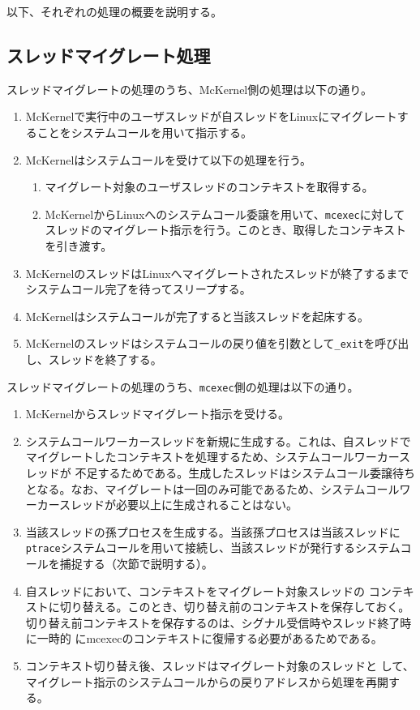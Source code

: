 \documentclass[twoside,11pt,fleqn]{book}
\begin{document}
以下、それぞれの処理の概要を説明する。

\subsection{スレッドマイグレート処理}
スレッドマイグレートの処理のうち、McKernel側の処理は以下の通り。
\begin{enumerate}
\item McKernelで実行中のユーザスレッドが自スレッドをLinuxにマイグレートすることをシステムコールを用いて指示する。
\item McKernelはシステムコールを受けて以下の処理を行う。
\begin{enumerate}
\item マイグレート対象のユーザスレッドのコンテキストを取得する。
\item McKernelからLinuxへのシステムコール委譲を用いて、\texttt{mcexec}に対してスレッドのマイグレート指示を行う。このとき、取得したコンテキストを引き渡す。
\end{enumerate}
\item McKernelのスレッドはLinuxへマイグレートされたスレッドが終了するまでシステムコール完了を待ってスリープする。
\item McKernelはシステムコールが完了すると当該スレッドを起床する。
\item McKernelのスレッドはシステムコールの戻り値を引数として\texttt{\_exit}を呼び出し、スレッドを終了する。
\end{enumerate}

スレッドマイグレートの処理のうち、\texttt{mcexec}側の処理は以下の通り。
\begin{enumerate}
\item McKernelからスレッドマイグレート指示を受ける。
\item システムコールワーカースレッドを新規に生成する。これは、自スレッドで
マイグレートしたコンテキストを処理するため、システムコールワーカースレッドが
不足するためである。生成したスレッドはシステムコール委譲待ちとなる。なお、マイグレートは一回のみ可能であるため、システムコールワーカースレッドが必要以上に生成されることはない。
\item 当該スレッドの孫プロセスを生成する。当該孫プロセスは当該スレッドに\texttt{ptrace}システムコールを用いて接続し、当該スレッドが発行するシステムコールを捕捉する（次節で説明する）。
\item 自スレッドにおいて、コンテキストをマイグレート対象スレッドの
コンテキストに切り替える。このとき、切り替え前のコンテキストを保存しておく。
切り替え前コンテキストを保存するのは、シグナル受信時やスレッド終了時に一時的
にmcexecのコンテキストに復帰する必要があるためである。
\item コンテキスト切り替え後、スレッドはマイグレート対象のスレッドと
して、マイグレート指示のシステムコールからの戻りアドレスから処理を再開する。
\end{enumerate}
\end{document}

